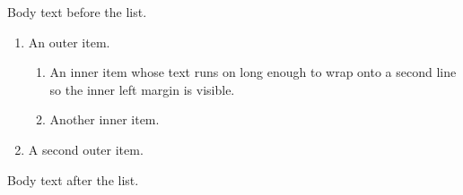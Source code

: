 \documentclass{article}
\begin{document}
Body text before the list.

\begin{enumerate}
  \item An outer item.
  \begin{enumerate}
    \item An inner item whose text runs on long enough to wrap onto a second
      line so the inner left margin is visible.
    \item Another inner item.
  \end{enumerate}
  \item A second outer item.
\end{enumerate}

Body text after the list.
\end{document}
